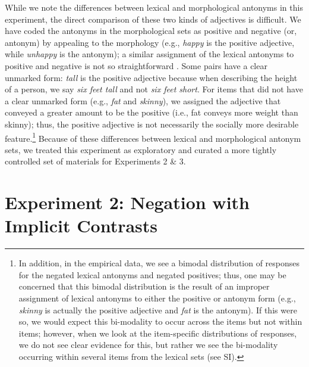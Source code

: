 \documentclass[floatsintext,doc]{apa6}
\let\rmarkdownfootnote\footnote%
\def\footnote{\protect\rmarkdownfootnote}
\begin{document}
While we note the differences between lexical and morphological antonyms in this experiment, the direct comparison of these two kinds of adjectives is difficult. 
We have coded the antonyms in the morphological sets as positive and negative (or, antonym) by appealing to the morphology (e.g., \emph{happy} is the positive adjective, while \emph{unhappy} is the antonym); a similar assignment of the lexical antonyms to positive and negative is not so straightforward \cite{Horn1989:Natural}.
Some pairs have a clear unmarked form: \emph{tall} is the positive adjective because when describing the height of a person, we say \emph{six feet tall} and not \emph{six feet short}.
For items that did not have a clear unmarked form (e.g., \emph{fat} and \emph{skinny}), we assigned the adjective that conveyed a greater amount to be the positive (i.e., fat conveys more weight than skinny); thus, the positive adjective is not necessarily the socially more desirable feature.\footnote{
In addition, in the empirical data, we see a bimodal distribution of responses for the negated lexical antonyms and negated positives; thus, one may be concerned that this bimodal distribution is the result of an improper assignment of lexical antonyms to either the positive or antonym form (e.g., \emph{skinny} is actually the positive adjective and \emph{fat} is the antonym). 
If this were so, we would expect this bi-modality to occur across the items but not within items; however, when we look at the item-specific distributions of responses, we do not see clear evidence for this, but rather we see the bi-modality occurring within several items from the lexical sets (see SI).
}
Because of these differences between lexical and morphological antonym sets, we treated this experiment as exploratory and curated a more tightly controlled set of materials for Experiments 2 \& 3.



\section{Experiment 2: Negation with Implicit Contrasts}\label{experiment-2-single-and-multiple-utterances}

\end{document}
